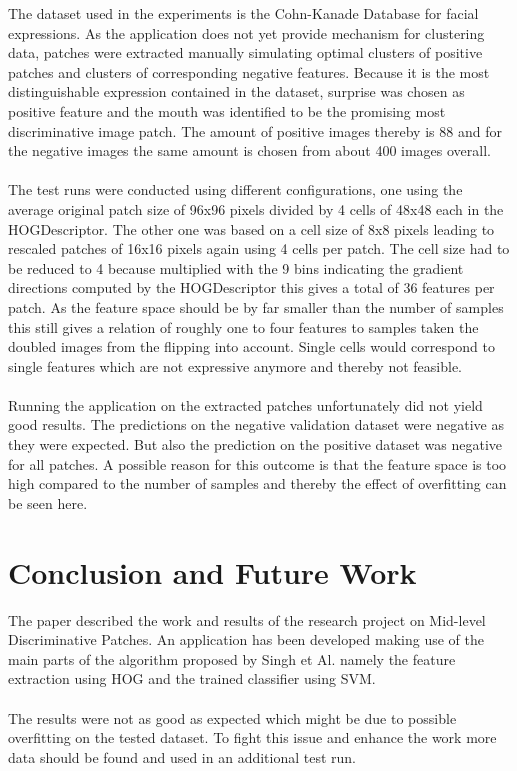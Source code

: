 \documentclass[%
   final,      %
   paper=a4,%
   paper=portrait, %
   pagesize=auto, %
   fontsize=10pt,%
   version=last, %
 ]{scrartcl} %
\begin{document}
The dataset used in the experiments is the Cohn-Kanade Database for facial expressions.\cite{Kanade2000CK+}\cite{Lucey2010CK+} As the application does not yet provide mechanism for clustering data, patches were extracted manually simulating optimal clusters of positive patches and clusters of corresponding negative features. Because it is the most distinguishable expression contained in the dataset, surprise was chosen as positive feature and the mouth was identified to be the promising most discriminative image patch. The amount of positive images thereby is 88 and for the negative images the same amount is chosen from about 400 images overall.
\\
\\
The test runs were conducted using different configurations, one using the average original patch size of 96x96 pixels divided by 4 cells of 48x48 each in the HOGDescriptor. The other one was based on a cell size of 8x8 pixels leading to rescaled patches of 16x16 pixels again using 4 cells per patch. The cell size had to be reduced to 4 because multiplied with the 9 bins indicating the gradient directions computed by the HOGDescriptor this gives a total of 36 features per patch. As the feature space should be by far smaller than the number of samples this still gives a relation of roughly one to four features to samples taken the doubled images from the flipping into account. Single cells would correspond to single features which are not expressive anymore and thereby not feasible.
\\
\\
Running the application on the extracted patches unfortunately did not yield good results. The predictions on the negative validation dataset were negative as they were expected. But also the prediction on the positive dataset was negative for all patches. A possible reason for this outcome is that the feature space is too high compared to the number of samples and thereby the effect of overfitting can be seen here.

\section{Conclusion and Future Work}

The paper described the work and results of the research project on Mid-level Discriminative Patches. An application has been developed making use of the main parts of the algorithm proposed by Singh et Al. namely the feature extraction using HOG and the trained classifier using SVM.
\\
\\
The results were not as good as expected which might be due to possible overfitting on the tested dataset. To fight this issue and enhance the work more data should be found and used in an additional test run.


%



\end{document}
